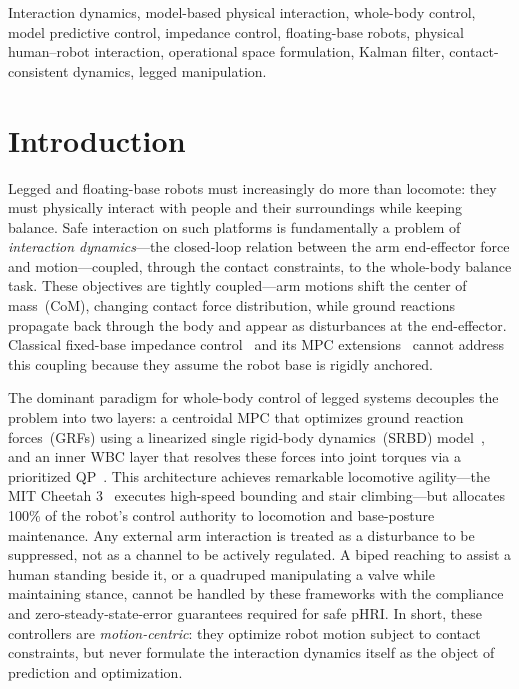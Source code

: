 \begin{IEEEkeywords}
Interaction dynamics, model-based physical interaction, whole-body control,
model predictive control, impedance control, floating-base robots, physical
human--robot interaction, operational space formulation, Kalman filter,
contact-consistent dynamics, legged manipulation.
\end{IEEEkeywords}

\section{Introduction}

Legged and floating-base robots must increasingly do more than locomote: they
must physically interact with people and their surroundings while keeping
balance. Safe interaction on such platforms is fundamentally a problem of
\emph{interaction dynamics}---the closed-loop relation between the arm
end-effector force and motion---coupled, through the contact constraints, to
the whole-body balance task.
These objectives are tightly coupled---arm motions shift the center of
mass~(CoM), changing contact force distribution, while ground reactions
propagate back through the body and appear as disturbances at the
end-effector.
Classical fixed-base impedance control~\cite{hogan1985impedance} and its
MPC extensions~\cite{cao2023passive,cao2026impedance} cannot address this
coupling because they assume the robot base is rigidly anchored.

The dominant paradigm for whole-body control of legged systems decouples
the problem into two layers: a centroidal MPC that optimizes ground
reaction forces~(GRFs) using a linearized single rigid-body dynamics~(SRBD)
model~\cite{dicarlo2018dynamic,kim2019highly}, and an inner WBC layer that
resolves these forces into joint torques via a prioritized
QP~\cite{bellicoso2016perception,koolen2016design}.
This architecture achieves remarkable locomotive agility---the MIT Cheetah
3~\cite{dicarlo2018dynamic} executes high-speed bounding and stair
climbing---but allocates 100\% of the robot's control authority to
locomotion and base-posture maintenance.
Any external arm interaction is treated as a disturbance to be suppressed,
not as a channel to be actively regulated.
A biped reaching to assist a human standing beside it, or a quadruped
manipulating a valve while maintaining stance, cannot be handled by these
frameworks with the compliance and zero-steady-state-error guarantees
required for safe pHRI.
In short, these controllers are \emph{motion-centric}: they optimize robot
motion subject to contact constraints, but never formulate the interaction
dynamics itself as the object of prediction and optimization.


